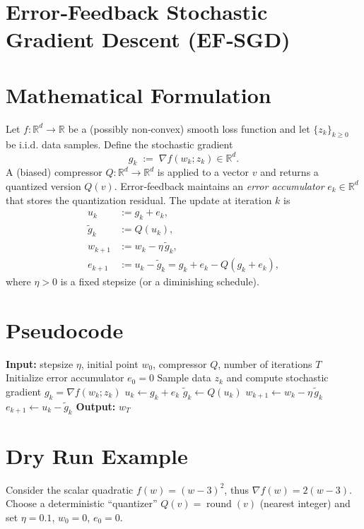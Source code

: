 \documentclass{article}
\newcommand{\RR}{\mathbb{R}}
\begin{document}
\section*{Error‑Feedback Stochastic Gradient Descent (EF‑SGD)}

\section*{Mathematical Formulation}
Let $f:\RR^{d}\!\to\!\RR$ be a (possibly non‑convex) smooth loss function and let $\{z_{k}\}_{k\ge 0}$ be i.i.d. data samples.
Define the stochastic gradient
\[
g_{k}\;:=\;\nabla f(w_{k};z_{k})\in\RR^{d}.
\]
A (biased) compressor $Q:\RR^{d}\!\to\!\RR^{d}$ is applied to a vector $v$ and returns a quantized version $Q(v)$.  
Error‑feedback maintains an \emph{error accumulator} $e_{k}\in\RR^{d}$ that stores the quantization residual.  
The update at iteration $k$ is
\[
\boxed{
\begin{aligned}
u_{k} &:= g_{k}+e_{k},\\[2mm]
\tilde{g}_{k} &:= Q(u_{k}),\\[2mm]
w_{k+1} &:= w_{k}-\eta\,\tilde{g}_{k},\\[2mm]
e_{k+1} &:= u_{k}-\tilde{g}_{k}=g_{k}+e_{k}-Q(g_{k}+e_{k}),
\end{aligned}}
\]
where $\eta>0$ is a fixed stepsize (or a diminishing schedule).  

\section*{Pseudocode}
\begin{algorithm}[H]
\caption{EF‑SGD}
\begin{algorithmic}[1]
\State \textbf{Input:} stepsize $\eta$, initial point $w_{0}$, compressor $Q$, number of iterations $T$
\State Initialize error accumulator $e_{0}=0$
    \State Sample data $z_{k}$ and compute stochastic gradient $g_{k}= \nabla f(w_{k};z_{k})$
    \State $u_{k}\gets g_{k}+e_{k}$                     
    \State $\tilde g_{k}\gets Q(u_{k})$                
    \State $w_{k+1}\gets w_{k}-\eta\,\tilde g_{k}$      
    \State $e_{k+1}\gets u_{k}-\tilde g_{k}$           
\EndFor
\State \textbf{Output:} $w_{T}$
\end{algorithmic}
\end{algorithm}

\section*{Dry Run Example}
Consider the scalar quadratic $f(w)=(w-3)^{2}$, thus $\nabla f(w)=2(w-3)$.  
Choose a deterministic ``quantizer'' $Q(v)=\operatorname{round}(v)$ (nearest integer) and set $\eta=0.1$, $w_{0}=0$, $e_{0}=0$.
\end{document}
